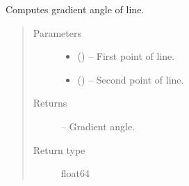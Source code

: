\documentclass[letterpaper,10pt,english]{sphinxmanual}
\begin{document}

\begin{fulllineitems}
\label{\detokenize{image_lines:image_lines.get_theta}}
Computes gradient angle of line.
\begin{quote}\begin{description}
\item[{Parameters}] \leavevmode\begin{itemize}
\item {} 
 () -- First point of line.

\item {} 
 () -- Second point of line.

\end{itemize}

\item[{Returns}] \leavevmode
{} -- Gradient angle.

\item[{Return type}] \leavevmode
float64

\end{description}\end{quote}

\end{fulllineitems}

\end{document}
